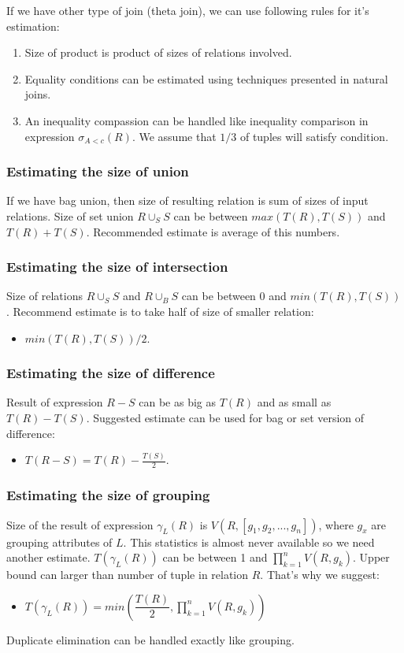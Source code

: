 If we have other type of join (theta join), we can use following rules for it's estimation:
\begin{enumerate}
\item Size of product is product of sizes of relations involved.
\item Equality conditions can be estimated using techniques presented in natural joins.
\item An inequality compassion can be handled like inequality comparison in expression $\sigma_{A<c}(R)$. We assume that $1/3$ of tuples will satisfy condition. 
\end{enumerate}

\subsubsection{Estimating the size of union}

If we have bag union, then size of resulting relation is sum of sizes of input relations. Size of set union $R \cup_S S$ can be between $max(T(R),T(S))$ and $T(R)+T(S)$. Recommended estimate is average of this numbers. 

\subsubsection{Estimating the size of intersection}
Size of relations $R\cup_S S$ and $R\cup_B S$ can be between $0$ and $min(T(R),T(S))$. Recommend estimate is to take half of size of smaller relation:
\begin{itemize}
\item  $min(T(R),T(S))/2$.
\end{itemize}

\subsubsection{Estimating the size of difference}

Result of expression $R-S$ can be as big as $T(R)$ and as small as $T(R)-T(S)$. Suggested estimate can be used for bag or set version of difference: 
\begin{itemize}
\item  $T(R-S)=T(R)-\frac{T(S)}{2}$.
\end{itemize}
\subsubsection{Estimating the size of grouping}
Size of the result of expression $\gamma_L(R)$ is $V(R,[g_1,g_2,...,g_n])$, where $g_x$ are grouping attributes of $L$. This statistics is almost never available so we need another estimate. $T(\gamma_L(R))$ can be between 1 and $\prod_{k=1}^{n}{V(R,g_k)}$. Upper bound can larger than number of tuple in relation $R$. That's why we suggest:
\begin{itemize}
\item $T(\gamma_L(R))=min(\dfrac{T(R)}{2},\prod_{k=1}^{n}{V(R,g_k)})$
\end{itemize}
Duplicate elimination can be handled exactly like grouping.

